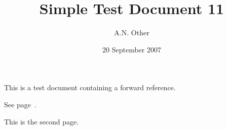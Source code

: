 \documentclass{article}
\date{20 September 2007}
\author{A.N. Other}
\title{Simple Test Document 11}
\begin{document}
\maketitle

This is a test document containing a forward reference.

See page~\pageref{pagetwo}.
\par
\pagebreak
This is the second page\label{pagetwo}.
\end{document}

